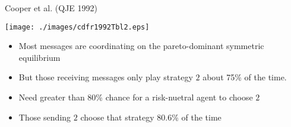 \documentclass{beamer}
\begin{document}
\begin{frame}{Cooper et al. (QJE 1992)}
\begin{center}\texttt{[image: ./images/cdfr1992Tbl2.eps]}\end{center}
	\begin{itemize}
		\item Most messages are coordinating on the pareto-dominant symmetric equilibrium
		\item But those receiving messages only play strategy $2$  about 75\% of the time.
		\item Need greater than 80\% chance for a risk-nuetral agent to choose $2$
		\item Those sending $2$ choose that strategy 80.6\% of the time
	\end{itemize}
\end{frame}
\end{document}
